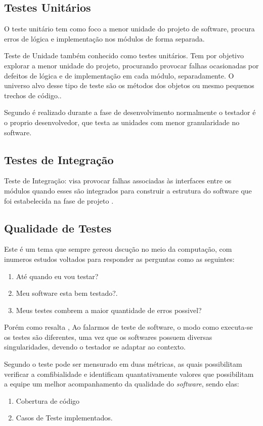 \subsection{Testes Unitários}
        O teste unitário tem como foco a menor unidade do projeto de software, procura erros de lógica e implementação nos módulos de forma separada.\cite{PRESSMAN} 

         Teste de Unidade também conhecido como testes unitários. Tem por objetivo explorar a menor unidade do projeto, procurando provocar falhas ocasionadas por defeitos de lógica e de implementação em cada módulo, separadamente. O universo alvo desse tipo de teste são os métodos dos objetos ou mesmo pequenos trechos de código.\cite{artigo_intro_teste}.

Segundo \cite{sw_test_tech} é realizado durante a fase de desenvolvimento normalmente o testador é o proprio desenvolvedor, que testa as unidades com menor granularidade no software.
        
        
\subsection{Testes de Integração}

Teste de Integração: visa provocar falhas associadas às interfaces entre os módulos quando esses são integrados para construir a estrutura do software que foi estabelecida na fase de projeto \cite{artigo_intro_teste}.


\subsection{Qualidade de Testes}

Este é um tema que sempre gereou dscução no meio da computação, com inumeros estudos voltados para responder as perguntas como as seguintes:

\begin{enumerate}
\item Até quando eu vou testar?
\item Meu software esta bem testado?.
\item Meus testes combrem a maior quantidade de erros possivel?
\end{enumerate}

Porém como resalta \cite{e08}, Ao falarmos de teste de software, o modo como executa-se os testes são diferentes, uma vez que os softwares possuem diversas singularidades, devendo o testador se adaptar ao contexto.

Segundo \cite{e08} o teste pode ser mensurado em duas métricas, as quais possibilitam verificar a comfibialidade e identificam quantativamente valores que possibilitam a equipe um melhor acompanhamento da qualidade do \textit{software}, sendo elas:
\begin{enumerate}
\item Cobertura de código
\item Casos de Teste implementados.
\end{enumerate}



